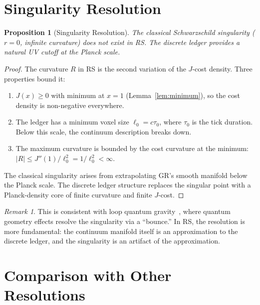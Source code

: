 \documentclass[12pt,a4paper]{article}
\newtheorem{proposition}[theorem]{Proposition}
\theoremstyle{definition}
\theoremstyle{remark}
\newtheorem{remark}[theorem]{Remark}
\begin{document}
\section{Singularity Resolution}
\label{sec:singularity}

\begin{proposition}[Singularity Resolution]
\label{thm:no-singularity}
The classical Schwarzschild singularity ($r = 0$,
infinite curvature) does not exist in RS.  The discrete
ledger provides a natural UV cutoff at the Planck scale.
\end{proposition}

\begin{proof}
The curvature $R$ in RS is the second variation of the $J$-cost
density.  Three properties bound it:
\begin{enumerate}[label=(\roman*),nosep]
  \item $J(x) \geq 0$ with minimum at $x = 1$
  (Lemma~\ref{lem:minimum}), so the cost density is
  non-negative everywhere.
  \item The ledger has a minimum voxel size
  $\ell_0 = c\tau_0$, where $\tau_0$ is the tick duration.
  Below this scale, the continuum description breaks down.
  \item The maximum curvature is bounded by the cost
  curvature at the minimum:
  $|R| \leq J''(1)/\ell_0^2 = 1/\ell_0^2 < \infty$.
\end{enumerate}
The classical singularity arises from extrapolating GR's
smooth manifold below the Planck scale.  The discrete ledger
structure replaces the singular point with a Planck-density
core of finite curvature and finite $J$-cost.
\end{proof}

\begin{remark}
This is consistent with loop quantum gravity~\cite{Bojowald2001},
where quantum geometry effects resolve the singularity via a
``bounce.''  In RS, the resolution is more fundamental: the
continuum manifold itself is an approximation to the discrete
ledger, and the singularity is an artifact of the approximation.
\end{remark}

\section{Comparison with Other Resolutions}
\label{sec:comparison}
\end{document}
